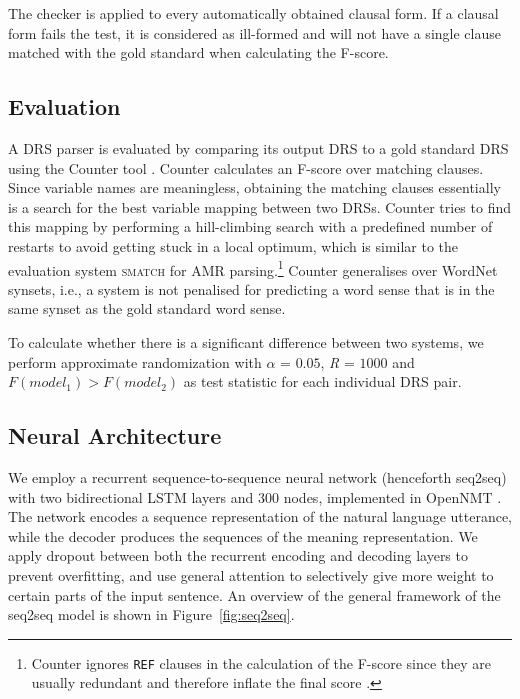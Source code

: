 \documentclass[11pt,a4paper]{article}
\begin{document}
The checker is applied to every automatically obtained clausal form.
If a clausal form fails the test, it is considered as ill-formed and will not have a single clause matched with the gold standard when calculating the F-score.

\subsection{Evaluation}
\label{ssec:evaluation}

A DRS parser is evaluated by comparing its output DRS to a gold standard DRS using the Counter tool \cite{pmb-LREC:18}. Counter calculates an F-score over matching clauses. Since variable names are meaningless, obtaining the matching clauses essentially is a search for the best variable mapping between two DRSs. Counter tries to find this mapping by performing a hill-climbing search with a predefined number of restarts to avoid getting stuck in a local optimum, which is similar to the evaluation system \textsc{smatch} \cite{smatch:13} for AMR parsing.\footnote{Counter ignores \texttt{REF} clauses in the calculation of the F-score since they are usually redundant and therefore inflate the final score \cite{pmb-LREC:18}.} 
Counter generalises over WordNet synsets, i.e., a system is not penalised for predicting a word sense that is in the same synset as the gold standard word sense. 

To calculate whether there is a significant difference between two systems, we perform approximate randomization \cite{random-appr:89} with $\alpha$ = $0.05$, \emph{R} = $1000$ and $F(model_{1}) > F(model_{2})$ as test statistic for each individual DRS pair. 

\subsection{Neural Architecture}
\label{sec:parameters}

We employ a recurrent sequence-to-sequence neural network (henceforth seq2seq) with two bidirectional LSTM layers and 300 nodes, implemented in OpenNMT \cite{opennmt:17}.
The network encodes a sequence representation of the natural language utterance, while the decoder produces the sequences of the meaning representation. We apply dropout \cite{dropout:14} between both the recurrent encoding and decoding layers to prevent overfitting, and use general attention \cite{luong15} to selectively give more weight to certain parts of the input sentence. An overview of the general framework of the seq2seq model is shown in Figure~\ref{fig:seq2seq}.
\end{document}

